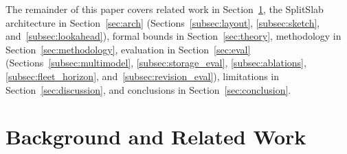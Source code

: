 \documentclass[10pt,journal,compsoc]{IEEEtran}
\theoremstyle{definition}
\theoremstyle{remark}
\newcommand{\SplitSlab}{\textup{\textsc{SplitSlab}}}
\def\SplitSlab{SplitSlab}%
\begin{document}
The remainder of this paper covers related work in Section~\ref{sec:related}, the \SplitSlab{} architecture in Section~\ref{sec:arch} (Sections~\ref{subsec:layout}, \ref{subsec:sketch}, and~\ref{subsec:lookahead}), formal bounds in Section~\ref{sec:theory}, methodology in Section~\ref{sec:methodology}, evaluation in Section~\ref{sec:eval} (Sections~\ref{subsec:multimodel}, \ref{subsec:storage_eval}, \ref{subsec:ablations}, \ref{subsec:fleet_horizon}, and~\ref{subsec:revision_eval}), limitations in Section~\ref{sec:discussion}, and conclusions in Section~\ref{sec:conclusion}.

\section{Background and Related Work}\label{sec:related}
\end{document}

